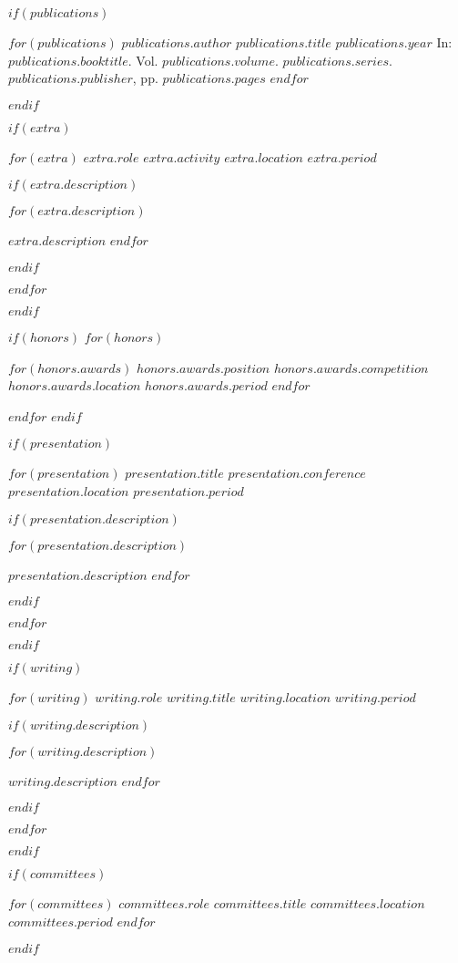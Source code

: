 \documentclass[11pt, a4paper]{awesome-cv}
\begin{document}
$if(publications)$
  \begin{cventries}
    $for(publications)$
      \cventry
      {$publications.author$}
      {$publications.title$}
      {$publications.year$}
      {}
      {In: \emph{$publications.booktitle$}. Vol. $publications.volume$. $publications.series$. $publications.publisher$, pp. $publications.pages$}
    $endfor$
  \end{cventries}
$endif$

$if(extra)$
  \begin{cventries}
    $for(extra)$
      \cventry
      {$extra.role$}
      {$extra.activity$}
      {$extra.location$}
      {$extra.period$}
      {
        $if(extra.description)$
          \begin{cvitems}
            $for(extra.description)$
              \item{$extra.description$}
            $endfor$
          \end{cvitems}
        $endif$
      }
    $endfor$
  \end{cventries}
$endif$

$if(honors)$
  $for(honors)$
    \begin{cvhonors}
      $for(honors.awards)$
        \cvhonor
        {$honors.awards.position$}
        {$honors.awards.competition$}
        {$honors.awards.location$}
        {$honors.awards.period$}
      $endfor$
    \end{cvhonors}
  $endfor$
$endif$

$if(presentation)$
  \begin{cventries}
    $for(presentation)$
      \cventry
      {$presentation.title$}
      {$presentation.conference$}
      {$presentation.location$}
      {$presentation.period$}
      {
        $if(presentation.description)$
          \begin{cvitems}
            $for(presentation.description)$
              \item{$presentation.description$}
            $endfor$
          \end{cvitems}
        $endif$
      }
    $endfor$
  \end{cventries}
$endif$

$if(writing)$
  \begin{cventries}
    $for(writing)$
      \cventry
      {$writing.role$}
      {$writing.title$}
      {$writing.location$}
      {$writing.period$}
      {
        $if(writing.description)$
          \begin{cvitems}
            $for(writing.description)$
              \item{$writing.description$}
            $endfor$
          \end{cvitems}
        $endif$
      }
    $endfor$
  \end{cventries}
$endif$

$if(committees)$
  \begin{cvhonors}
    $for(committees)$
      \cvhonor
      {$committees.role$}
      {$committees.title$}
      {$committees.location$}
      {$committees.period$}
    $endfor$
  \end{cvhonors}
$endif$
\end{document}
